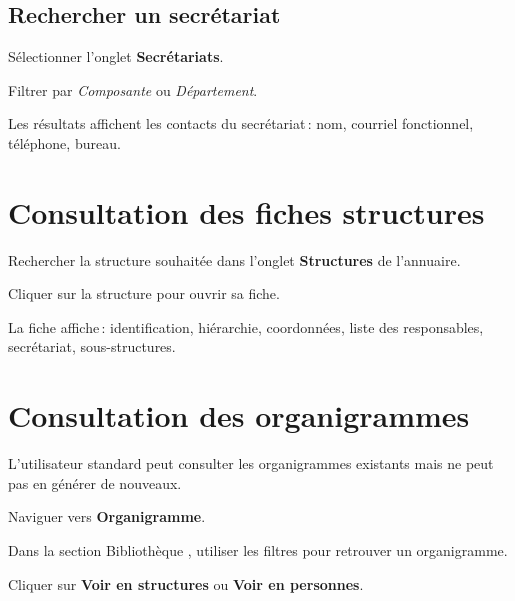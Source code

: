 \subsection{Rechercher un secr\'etariat}

\begin{steps}
  \item S\'electionner l'onglet \textbf{Secr\'etariats}.
  \item Filtrer par \textit{Composante} ou \textit{D\'epartement}.
  \item Les r\'esultats affichent les contacts du secr\'etariat\,: nom, courriel fonctionnel, t\'el\'ephone, bureau.
\end{steps}

\section{Consultation des fiches structures}

\begin{steps}
  \item Rechercher la structure souhait\'ee dans l'onglet \textbf{Structures} de l'annuaire.
  \item Cliquer sur la structure pour ouvrir sa fiche.
  \item La fiche affiche\,: identification, hi\'erarchie, coordonn\'ees, liste des responsables, secr\'etariat, sous-structures.
\end{steps}


\section{Consultation des organigrammes}

L'utilisateur standard peut consulter les organigrammes existants mais ne peut pas en g\'en\'erer de nouveaux.

\begin{steps}
  \item Naviguer vers \textbf{Organigramme}.
  \item Dans la section \og Biblioth\`eque \fg{}, utiliser les filtres pour retrouver un organigramme.
  \item Cliquer sur \textbf{Voir en structures} ou \textbf{Voir en personnes}.
\end{steps}

